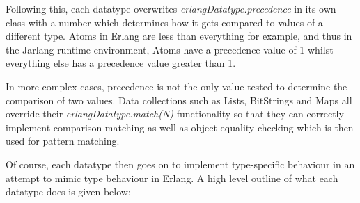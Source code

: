 \documentclass[twoside,12pt,titlepage,a4paper]{article}
\begin{document}
Following this, each datatype overwrites \textit{erlangDatatype.precedence} in its own class with a number which determines how it gets compared to values of a different type. Atoms in Erlang are less than everything for example, and thus in the Jarlang runtime environment, Atoms have a precedence value of 1 whilst everything else has a precedence value greater than 1.

In more complex cases, precedence is not the only value tested to determine the comparison of two values. Data collections such as Lists, BitStrings and Maps all override their \textit{erlangDatatype.match(N)} functionality so that they can correctly implement comparison matching as well as object equality checking which is then used for pattern matching.

Of course, each datatype then goes on to implement type-specific behaviour in an attempt to mimic type behaviour in Erlang. A high level outline of what each datatype does is given below:
\end{document}
